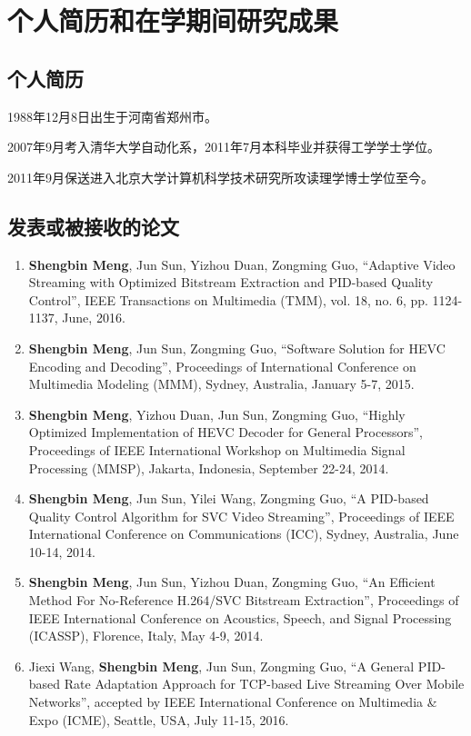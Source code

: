 \chapter{个人简历和在学期间研究成果}

\section*{个人简历}

1988年12月8日出生于河南省郑州市。

2007年9月考入清华大学自动化系，2011年7月本科毕业并获得工学学士学位。

2011年9月保送进入北京大学计算机科学技术研究所攻读理学博士学位至今。

\renewcommand{\labelenumi}{[\arabic{enumi}]}

\section*{发表或被接收的论文}
\begin{enumerate}
	\item \textbf{Shengbin Meng}, Jun Sun, Yizhou Duan, Zongming Guo, ``Adaptive Video Streaming with Optimized Bitstream Extraction and PID-based Quality Control'', IEEE Transactions on Multimedia (TMM), vol. 18, no. 6, pp. 1124-1137, June, 2016.
	\item \textbf{Shengbin Meng}, Jun Sun, Zongming Guo, ``Software Solution for HEVC Encoding and Decoding'', Proceedings of International Conference on Multimedia Modeling (MMM), Sydney, Australia, January 5-7, 2015.
	\item \textbf{Shengbin Meng}, Yizhou Duan, Jun Sun, Zongming Guo, ``Highly Optimized Implementation of HEVC Decoder for General Processors'', Proceedings of IEEE International Workshop on Multimedia Signal Processing (MMSP), Jakarta, Indonesia, September 22-24, 2014.
	\item \textbf{Shengbin Meng}, Jun Sun, Yilei Wang, Zongming Guo, ``A PID-based Quality Control Algorithm for SVC Video Streaming'', Proceedings of IEEE International Conference on Communications (ICC), Sydney, Australia, June 10-14, 2014.
	\item \textbf{Shengbin Meng}, Jun Sun, Yizhou Duan, Zongming Guo, ``An Efficient Method For No-Reference H.264/SVC Bitstream Extraction'', Proceedings of IEEE International Conference on Acoustics, Speech, and Signal Processing (ICASSP), Florence, Italy, May 4-9, 2014.
	\item Jiexi Wang, \textbf{Shengbin Meng}, Jun Sun, Zongming Guo, ``A General PID-based Rate Adaptation Approach for TCP-based Live Streaming Over Mobile Networks'', accepted by IEEE International Conference on Multimedia \& Expo (ICME), Seattle, USA, July 11-15, 2016.
\end{enumerate}

